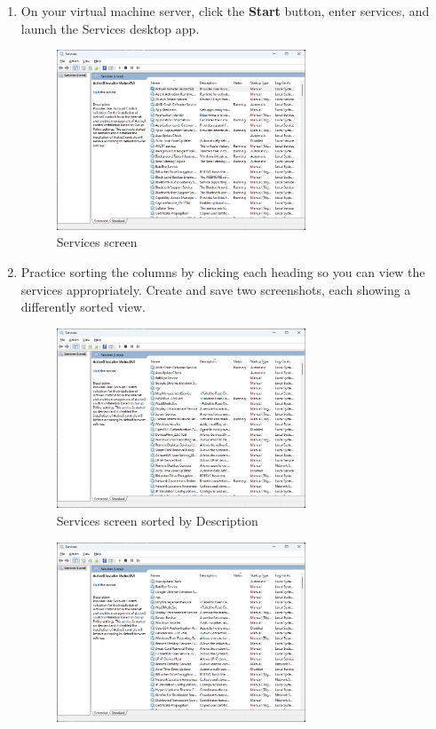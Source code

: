 \documentclass[12pt]{article}
\newenvironment{problem}[2][Problem]{\begin{trivlist}
\item[\hskip \labelsep {\bfseries #1}\hskip \labelsep {\bfseries #2.}]}{\end{trivlist}}
\begin{document}
\begin{problem}{1}
\begin{enumerate}
    \item On your virtual machine server, click the \textbf{Start} button, enter services, and launch the Services desktop app.
    \begin{figure}[H]
        \centering
        \includegraphics[width=0.7\textwidth]{services}
        \caption{Services screen}
    \end{figure}
    \pagebreak
    \item Practice sorting the columns by clicking each heading so you can view the services appropriately. Create
    and save two screenshots, each showing a differently sorted view.
    \begin{figure}[H]
        \centering
        \includegraphics[width=0.7\textwidth]{services2}
        \caption{Services screen sorted by Description}
    \end{figure}
    \begin{figure}[H]
        \centering
        \includegraphics[width=0.7\textwidth]{services3}

\end{figure}
\end{enumerate}
\end{problem}
\end{document}
